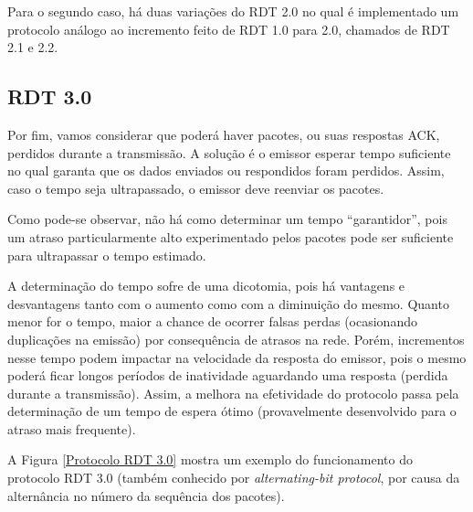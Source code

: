 Para o segundo caso, há duas variações do RDT 2.0 no qual é implementado
um protocolo análogo ao incremento feito de RDT 1.0 para 2.0, chamados
de RDT 2.1 e 2.2.

\hypertarget{rdt-3.0}{%
\subsection{RDT 3.0}\label{rdt-3.0}}

Por fim, vamos considerar que poderá haver pacotes, ou suas respostas
ACK, perdidos durante a transmissão. A solução é o emissor esperar tempo
suficiente no qual garanta que os dados enviados ou respondidos foram
perdidos. Assim, caso o tempo seja ultrapassado, o emissor deve reenviar
os pacotes.

Como pode-se observar, não há como determinar um tempo ``garantidor'',
pois um atraso particularmente alto experimentado pelos pacotes pode ser
suficiente para ultrapassar o tempo estimado.

A determinação do tempo sofre de uma dicotomia, pois há vantagens e
desvantagens tanto com o aumento como com a diminuição do mesmo. Quanto
menor for o tempo, maior a chance de ocorrer falsas perdas (ocasionando
duplicações na emissão) por consequência de atrasos na rede. Porém,
incrementos nesse tempo podem impactar na velocidade da resposta do
emissor, pois o mesmo poderá ficar longos períodos de inatividade
aguardando uma resposta (perdida durante a transmissão). Assim, a
melhora na efetividade do protocolo passa pela determinação de um tempo
de espera ótimo (provavelmente desenvolvido para o atraso mais
frequente).

A Figura \ref{Protocolo RDT 3.0} mostra um exemplo do funcionamento do protocolo RDT 3.0
(também conhecido por \emph{alternating-bit protocol}, por causa da
alternância no número da sequência dos pacotes).

